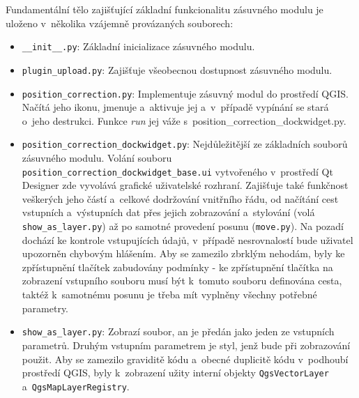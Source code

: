 Fundamentální tělo zajišťující základní funkcionalitu zásuvného modulu je ulože\-no v~několika vzájemně
provázaných souborech: 
\begin{itemize}

	\item {\tt \_\_init\_\_.py}: Základní inicializace zásuvného modulu. 

	\item {\tt plugin\_upload.py}: Zajišťuje všeobecnou dostupnost zásuvného modulu. 	

	\item {\tt position\_correction.py}: Implementuje zásuvný modul do prostředí QGIS. Načítá jeho ikonu,
	jmenuje a~aktivuje jej a~v~případě vypínání se stará o~jeho destrukci. Funkce \textit{run} jej váže
	s~position\_correction\_dockwidget.py. 
	
	\item {\tt position\_correction\_dockwidget.py}: Nejdůle\-žitěj\-ší
	ze základních souborů zá\-suvného modulu. Volání
	souboru {\tt position\_correction\_dockwidget\_base.ui}
	vytvoře\-ného v~prostředí Qt Designer
	zde vyvolává grafické uživatelské rozhraní. Zajišťuje
	také funkčnost ve\-škerých jeho částí a~celkové
	dodržování vnitřního řádu, od načítání cest vstupních
	a~výstupních dat přes jejich zobrazování a~stylování (volá
	{\tt show\_as\_layer.py}) až po samotné provedení posunu ({\tt move.py}).
	Na pozadí dochází ke kontrole vstupujících údajů, v~případě nesrovnalostí
	bude uživatel u\-pozorněn chybovým hlášením. Aby se zamezilo zbrklým nehodám, byly ke zpřístupnění
	tlačítek zabudovány podmínky - ke zpřístupnění tlačítka na zobrazení vstupního souboru musí být
	k~tomuto souboru definována cesta, taktéž k~samotnému posunu je třeba mít vyplněny všechny potřebné
	parametry. 
	
	\item {\tt show\_as\_layer.py}: Zobrazí soubor, an
	je předán jako jeden ze vstupních parame\-trů. Druhým
	vstupním parametrem je styl, jenž bude při zobrazování použit. Aby se zamezilo graviditě kódu
	a~obecné duplicitě kódu v~podhoubí prostředí QGIS, byly k~zobrazení užity interní objekty
	{\tt QgsVectorLayer} a~{\tt QgsMapLayerRegistry}. 

\end{itemize}

